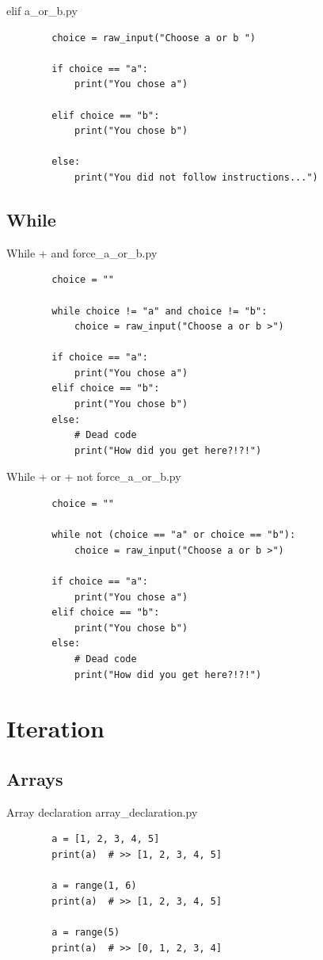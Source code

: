 \documentclass[11pt]{beamer}
\begin{document}
\begin{frame}[fragile]{elif}
	a\_or\_b.py
	\begin{lstlisting}
		choice = raw_input("Choose a or b ")
		
		if choice == "a":
		    print("You chose a")

		elif choice == "b":
		    print("You chose b")
		
		else:
		    print("You did not follow instructions...")
	\end{lstlisting}
\end{frame}

\subsection{While}
\begin{frame}[fragile]{While + and}
	force\_a\_or\_b.py
	\begin{lstlisting}
		choice = ""
		
		while choice != "a" and choice != "b":
			choice = raw_input("Choose a or b >")
		
		if choice == "a":
		    print("You chose a")
		elif choice == "b":
		    print("You chose b")
		else:
		    # Dead code
		    print("How did you get here?!?!")
	\end{lstlisting}
\end{frame}

\begin{frame}[fragile]{While + or + not}
	force\_a\_or\_b.py
	\begin{lstlisting}
		choice = ""
		
		while not (choice == "a" or choice == "b"):
			choice = raw_input("Choose a or b >")
		
		if choice == "a":
		    print("You chose a")
		elif choice == "b":
		    print("You chose b")
		else:
		    # Dead code
		    print("How did you get here?!?!")
	\end{lstlisting}
\end{frame}

\section{Iteration}
\subsection{Arrays}
\begin{frame}[fragile]{Array declaration}
	array\_declaration.py
	\begin{lstlisting}
		a = [1, 2, 3, 4, 5]
		print(a)  # >> [1, 2, 3, 4, 5]
		
		a = range(1, 6)
		print(a)  # >> [1, 2, 3, 4, 5]
		
		a = range(5)
		print(a)  # >> [0, 1, 2, 3, 4]
	\end{lstlisting}
\end{frame}
\end{document}
